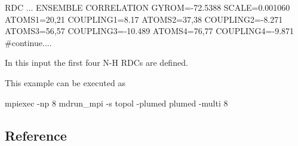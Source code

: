\begin{DoxyVerb}RDC ...
ENSEMBLE
CORRELATION
GYROM=-72.5388
SCALE=0.001060 
ATOMS1=20,21 COUPLING1=8.17
ATOMS2=37,38 COUPLING2=-8.271
ATOMS3=56,57 COUPLING3=-10.489
ATOMS4=76,77 COUPLING4=-9.871
#continue....
\end{DoxyVerb}


In this input the first four N-\/\+H R\+D\+Cs are defined.

This example can be executed as \begin{DoxyVerb}mpiexec -np 8 mdrun_mpi -s topol -plumed plumed -multi 8
\end{DoxyVerb}
\hypertarget{belfast-9_refer}{}\subsection{Reference}\label{belfast-9_refer}

